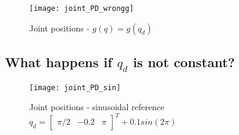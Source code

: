 \begin{figure}[H]
\centering
\texttt{[image: joint\_PD\_wrongg]}
\caption{Joint positions - $g(q)=g(q_d)$}
\end{figure}

\subsection{What happens if $q_d$ is not constant?}


\begin{figure}[H]
\centering
\texttt{[image: joint\_PD\_sin]}
\caption{Joint positions - sinusoidal reference $q_d = \begin{bmatrix}
\pi/2& -0.2& \pi
\end{bmatrix}^T + 0.1sin(2\pi)$}
\end{figure}
